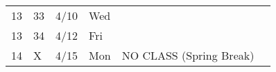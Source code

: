 \begin{longtable}[]{@{}llllll@{}}
\begin{minipage}[t]{0.03\columnwidth}
13\strut
\end{minipage} & \begin{minipage}[t]{0.03\columnwidth}\raggedright
33\strut
\end{minipage} & \begin{minipage}[t]{0.06\columnwidth}\raggedright
4/10\strut
\end{minipage} & \begin{minipage}[t]{0.04\columnwidth}\raggedright
Wed\strut
\end{minipage} & \begin{minipage}[t]{0.49\columnwidth}\raggedright
\strut
\end{minipage} & \begin{minipage}[t]{0.17\columnwidth}\raggedright
\strut
\end{minipage}\tabularnewline
\begin{minipage}[t]{0.03\columnwidth}\raggedright
13\strut
\end{minipage} & \begin{minipage}[t]{0.03\columnwidth}\raggedright
34\strut
\end{minipage} & \begin{minipage}[t]{0.06\columnwidth}\raggedright
4/12\strut
\end{minipage} & \begin{minipage}[t]{0.04\columnwidth}\raggedright
Fri\strut
\end{minipage} & \begin{minipage}[t]{0.49\columnwidth}\raggedright
\strut
\end{minipage} & \begin{minipage}[t]{0.17\columnwidth}\raggedright
\strut
\end{minipage}\tabularnewline
\begin{minipage}[t]{0.03\columnwidth}\raggedright
14\strut
\end{minipage} & \begin{minipage}[t]{0.03\columnwidth}\raggedright
X\strut
\end{minipage} & \begin{minipage}[t]{0.06\columnwidth}\raggedright
4/15\strut
\end{minipage} & \begin{minipage}[t]{0.04\columnwidth}\raggedright
Mon\strut
\end{minipage} & \begin{minipage}[t]{0.49\columnwidth}\raggedright
NO CLASS (Spring Break)\strut
\end{minipage} & \begin{minipage}[t]{0.17\columnwidth}\raggedright

\end{minipage}
\end{longtable}

